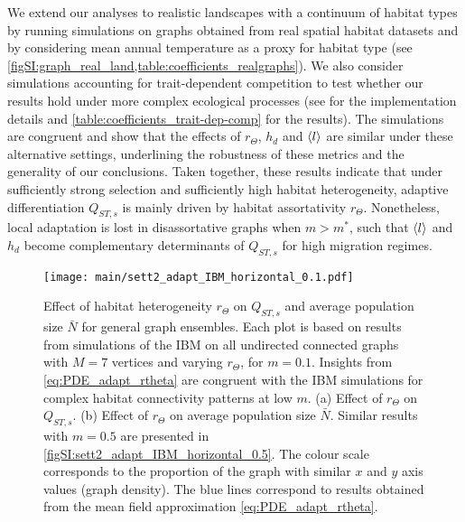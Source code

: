   We extend our analyses to realistic landscapes with a continuum of habitat types by running simulations on graphs obtained from real spatial habitat datasets and by considering mean annual temperature as a proxy for habitat type (see \cref{figSI:graph_real_land,table:coefficients_realgraphs}). 
  We also consider simulations accounting for trait-dependent competition to test whether our results hold under more complex ecological processes (see  for the implementation details and \cref{table:coefficients_trait-dep-comp} for the results). 
  The simulations are congruent and show that the effects of $r_\Theta$, $h_d$ and $\langle l \rangle$ are similar under these alternative settings, underlining the robustness of these metrics and the generality of our conclusions.
  Taken together, these results indicate that under sufficiently strong selection and sufficiently high habitat heterogeneity, adaptive differentiation $Q_{ST,s}$ is mainly driven by habitat assortativity $r_\Theta$. %
  Nonetheless, local adaptation is lost in disassortative graphs when $m > m^*$, such that $\langle l \rangle$ and $h_d$ become complementary determinants of $Q_{ST,s}$ for high migration regimes.
  
  \begin{figure}[ht]
	\centering
	  \texttt{[image: main/sett2\_adapt\_IBM\_horizontal\_0.1.pdf]}
	  \caption{{\small Effect of habitat heterogeneity $r_\Theta$ on $Q_{ST,s}$ and average population size $\bar{N}$ for general graph ensembles. Each plot is based on results from simulations of the IBM on all undirected connected graphs with $M=7$ vertices and varying $r_\Theta$, for $m = 0.1$. Insights from \cref{eq:PDE_adapt_rtheta} are congruent with the IBM simulations for complex habitat connectivity patterns at low $m$. (a) Effect of $r_\Theta$ on $Q_{ST,s}$. (b) Effect of $r_\Theta$ on average population size $\bar{N}$. Similar results with $m=0.5$ are presented in \cref{figSI:sett2_adapt_IBM_horizontal_0.5}. The colour scale corresponds to the proportion of the graph with similar $x$ and $y$ axis values (graph density). The blue lines correspond to results obtained from the mean field approximation \cref{eq:PDE_adapt_rtheta}.}}
	  \label{fig:sett2_adapt_IBM_horizontal_0.1}
  \end{figure}
  
